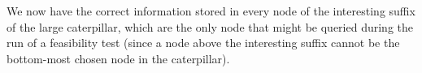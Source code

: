 \documentclass[11pt,a4paper]{article}
\theoremstyle{definition}
\theoremstyle{remark}
\begin{document}
We now have the correct information stored in every node of the interesting suffix of the large caterpillar, which are the only node that might be queried during the run of a feasibility test (since a node above the interesting suffix cannot be the bottom-most chosen node in the caterpillar).

\end{document}
